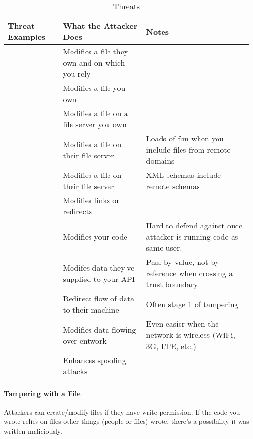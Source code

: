 \begin{table}[h!]
  \centering
  \begin{tabular}{p{5.7cm}p{5.7cm}p{5.7cm}}
    \toprule
    Threat Examples & What the Attacker Does & Notes \\
    \midrule
    \multirow{6}{5.7cm}{\nameref{par:Tampering_File}} & Modifies a file they own and on which you rely & \\ \cline{2-3}
                                               & Modifies a file you own & \\ \cline{2-3}
                                               & Modifies a file on a file server you own & \\ \cline{2-3}
                                               & Modifies a file on their file server & Loads of fun when you include files from remote domains \\ \cline{2-3}
                                               & Modifies a file on their file server & XML schemas include remote schemas \\ \cline{2-3}
    & Modifies links or redirects & \\
    \midrule
    \multirow{6}{5.7cm}{\nameref{par:Tampering_Memory}} & Modifies your code & Hard to defend against once attacker is running code as same user. \\ \cline{2-3}
    & Modifes data they've supplied to your API & Pass by value, not by reference when crossing a trust boundary \\
    \midrule
    \multirow{6}{5.7cm}{\nameref{par:Tampering_Network}} & Redirect flow of data to their machine & Often stage 1 of tampering \\ \cline{2-3}
                                               & Modifies data flowing over entwork & Even easier when the network is wireless (WiFi, 3G, LTE, etc.) \\ \cline{2-3}
    & Enhances spoofing attacks & \\
    \bottomrule
  \end{tabular}
  \caption{ Threats}
  \label{tab:Tampering_Threats}
\end{table}

\paragraph{Tampering with a File}\label{par:Tampering_File}
Attackers can create/modify files if they have write permission.
If the code you wrote relies on files other things (people or files) wrote, there's a possibility it was written maliciously.

